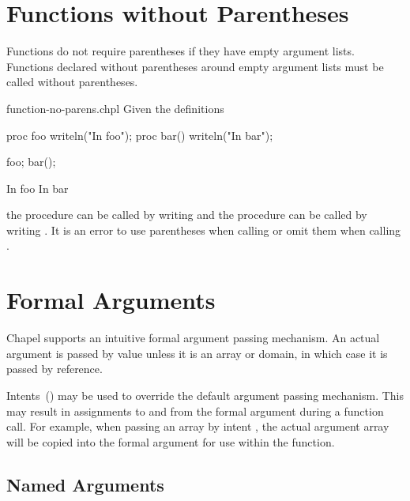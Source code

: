 \section{Functions without Parentheses}
\label{Functions_without_Parentheses}

Functions do not require parentheses if they have empty argument
lists.  Functions declared without parentheses around empty argument
lists must be called without parentheses.

\begin{chapelexample}{function-no-parens.chpl}
Given the definitions
\begin{chapel}
proc foo { writeln("In foo"); }
proc bar() { writeln("In bar"); }
\end{chapel}
\begin{chapelpost}
foo;
bar();
\end{chapelpost}
\begin{chapeloutput}
In foo
In bar
\end{chapeloutput}
the procedure  can be called by writing  and the
procedure  can be called by writing .  It is an
error to use parentheses when calling  or omit them
when calling .
\end{chapelexample}


\section{Formal Arguments}
\label{Formal_Arguments}

Chapel supports an intuitive formal argument passing mechanism.  An
actual argument is passed by value unless it is an array or domain, in
which case it is passed by reference.

Intents~() may be used to override the default
argument passing mechanism.  This may result in assignments to and from
the formal argument during a function call.  For example, when passing an array by
intent , the actual argument array will be copied into the formal argument
for use within the function.

\subsection{Named Arguments}
\label{Named_Arguments}

